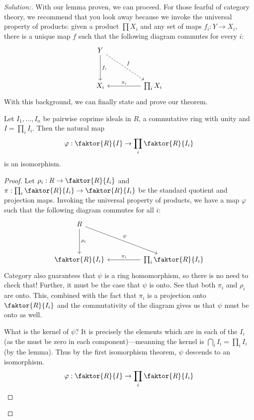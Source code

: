 \begin{proof}[Solution:]
  With our lemma proven, we can proceed. For those fearful of category theory,
  we recommend that you look away because we invoke the universal property of
  products: given a product \(\prod X_i\) and any set of maps
  \(f_i: Y \to X_i\), there is a unique map \(f\) such that the following
  diagram commutes for every \(i\):
\[\begin{tikzcd}
	Y \\
	\\
	{X_i} && {\prod_i X_i}
	\arrow["{f_i}", from=1-1, to=3-1]
	\arrow["{\pi_i}"', from=3-3, to=3-1]
	\arrow["f", dashed, from=1-1, to=3-3]
  \end{tikzcd}\]
  With this background, we can finally state and prove our theorem.
  \begin{ntheorem}
   Let \(I_1, \dots , I_n\) be pairwise coprime ideals in \(R\), a commutative
   ring with unity and \(I = \prod_i I_i\). Then the natural map
   \[
     \varphi: \faktor{R}{I} \to \prod_i \faktor{R}{I_i}
   \]
   is an isomorphism.
  \end{ntheorem}
  \begin{proof}
    Let \(\rho_i: R\to \faktor{R}{I_i} \) and
    \(\pi: \prod_i \faktor{R}{I_i} \to \faktor{R}{I_i} \) be the standard
    quotient and projection maps. Invoking the universal property of products,
    we have a map \(\varphi\) such that the following diagram commutes for all \(i\):
\[\begin{tikzcd}
	R \\
	\\
	{\faktor{R}{I_i}} && {\prod_i \faktor{R}{I_i}}
	\arrow["{\rho_i}", from=1-1, to=3-1]
	\arrow["{\pi_i}"', from=3-3, to=3-1]
	\arrow["\psi", from=1-1, to=3-3]
\end{tikzcd}\]
    Category also guarantees that \(\psi\) is a ring homomorphism, so there
    is no need to check that! Further, it must be the case that \(\psi\) is
    onto. See that both \(\pi_i\) and \(\rho_i\) are onto. This, combined with
    the fact that \(\pi_i\) is a projection onto \(\faktor{R}{I_i} \) and the
    commutativity of the diagram gives us that  \(\psi\) must be onto as well.

    What is the kernel of \(\psi\)? It is precisely the elements which are in
    each of the \(I_i\) (as the must be zero in each component)---meanning the
    kernel is \(\bigcap_i I_i= \prod_i I_i\) (by the lemma). Thus by the first
    isomorphism theorem, \(\psi\) descends to an isomorphism.
   \[
     \varphi: \faktor{R}{I} \to \prod_i \faktor{R}{I_i}
   \]
  \end{proof}
\end{proof}
